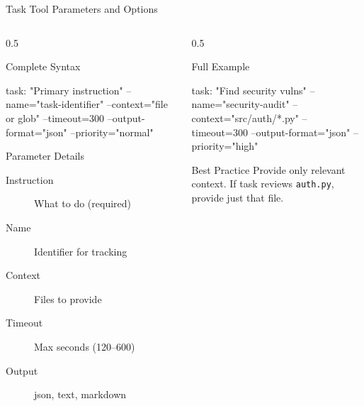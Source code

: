 \documentclass[aspectratio=169,11pt]{beamer}
\begin{document}
\begin{frame}[fragile]{Task Tool Parameters and Options}
\begin{columns}[T]
\begin{column}{0.5\textwidth}
\begin{block}{Complete Syntax}
\begin{semiverbatim}\scriptsize
\textcolor{UofSCGarnet}{task:} "Primary instruction"
  --name="task-identifier"
  --context="file or glob"
  --timeout=300
  --output-format="json"
  --priority="normal"
\end{semiverbatim}
\end{block}

\begin{block}{Parameter Details}
\begin{description}
    \item[Instruction] What to do (required)
    \item[Name] Identifier for tracking
    \item[Context] Files to provide
    \item[Timeout] Max seconds (120--600)
    \item[Output] json, text, markdown
\end{description}
\end{block}
\end{column}
\begin{column}{0.5\textwidth}
\begin{exampleblock}{Full Example}
\begin{semiverbatim}\scriptsize
\textcolor{UofSCGarnet}{task:} "Find security vulns"
  --name="security-audit"
  --context="src/auth/*.py"
  --timeout=300
  --output-format="json"
  --priority="high"
\end{semiverbatim}
\end{exampleblock}

\begin{alertblock}{Best Practice}
Provide only relevant context. If task reviews \texttt{auth.py}, provide just that file.
\end{alertblock}
\end{column}
\end{columns}
\end{frame}
\end{document}
